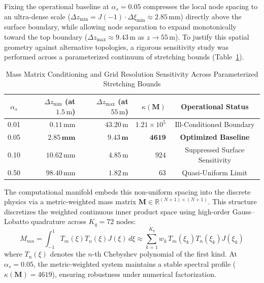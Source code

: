 \documentclass[11pt,a4paper]{article}
\begin{document}
Fixing the operational baseline at $\alpha_s = 0.05$ compresses the local node spacing to an ultra-dense scale ($\Delta z_{\min} = J(-1) \cdot \Delta \xi_{\min} \approx 2.85\,\text{mm}$) directly above the surface boundary, while allowing node separation to expand monotonically toward the top boundary ($\Delta z_{\max} \approx 9.43\,\text{m}$ as $z \rightarrow 55\,\text{m}$). To justify this spatial geometry against alternative topologies, a rigorous sensitivity study was performed across a parameterized continuum of stretching bounds (Table~\ref{tab:stretch_sensitivity}).

\begin{table}[h]
\centering
\caption{Mass Matrix Conditioning and Grid Resolution Sensitivity Across Parameterized Stretching Bounds}
\label{tab:stretch_sensitivity}
\begin{tabular}{c|rrrc}
\hline
$\alpha_s$ & $\Delta z_{\min}$ (at $1.5\,\text{m}$) & $\Delta z_{\max}$ (at $55\,\text{m}$) & $\kappa(\mathbf{M})$ & Operational Status \\
\hline
0.01 & $0.11\,\text{mm}$ & $43.20\,\text{m}$ & $1.21 \times 10^5$ & Ill-Conditioned Boundary \\
0.05 & $\mathbf{2.85\,\text{mm}}$ & $\mathbf{9.43\,\text{m}}$ & $\mathbf{4619}$ & \textbf{Optimized Baseline} \\
0.10 & $10.62\,\text{mm}$ & $4.85\,\text{m}$ & $924$ & Suppressed Surface Sensitivity \\
0.50 & $98.40\,\text{mm}$ & $1.82\,\text{m}$ & $63$ & Quasi-Uniform Limit \\
\hline
\end{tabular}
\end{table}

The computational manifold embeds this non-uniform spacing into the discrete physics via a metric-weighted mass matrix $\mathbf{M} \in \mathbb{R}^{(N+1) \times (N+1)}$. This structure discretizes the weighted continuous inner product space using high-order Gauss--Lobatto quadrature across $K_q = 72$ nodes:
\begin{equation}
M_{mn} = \int_{-1}^{1} T_m(\xi) T_n(\xi) J(\xi) \, d\xi \approx \sum_{k=1}^{K_q} w_k \, T_m(\xi_k) T_n(\xi_k) J(\xi_k)
\label{eq:mass_matrix_quad}
\end{equation}
where $T_n(\xi)$ denotes the $n$-th Chebyshev polynomial of the first kind. At $\alpha_s = 0.05$, the metric-weighted system maintains a stable spectral profile ($\kappa(\mathbf{M}) = 4619$), ensuring robustness under numerical factorization.
\end{document}
